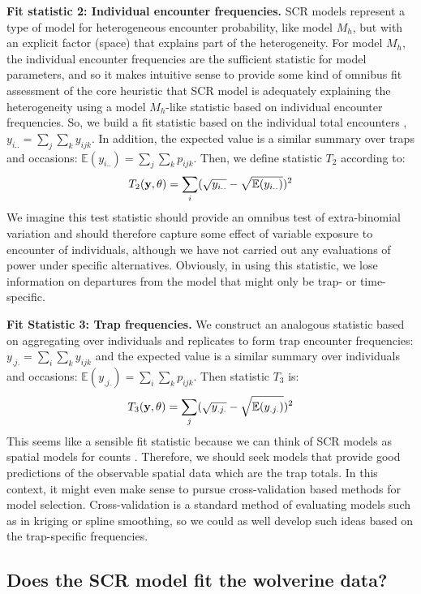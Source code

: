 {\bf Fit statistic 2: Individual encounter frequencies. } SCR models
represent a type of model for heterogeneous encounter probability, like model $M_h$, but with an explicit
factor (space) that explains part of the heterogeneity. For model $M_h$, the
individual encounter frequencies are the sufficient statistic for
model parameters, and so it makes intuitive sense to provide some kind
of omnibus fit assessment of the core heuristic that SCR model is
adequately explaining the heterogeneity using a model $M_h$-like
statistic based on individual encounter frequencies.  So, we build a
fit statistic based on the individual total encounters
\citep{russell_etal:2012}, $y_{i..} = \sum_{j} \sum_{k} y_{ijk}$. In
addition, the expected value is a similar summary over traps and
occasions: $\mathbb{E}(y_{i..}) = \sum_{j} \sum_{k}
p_{ijk}$. Then, we define statistic $T_{2}$ according to:
\[
 T_{2}({\bf y}, \theta) = \sum_{i} (\sqrt{ y_{i..} } - \sqrt{ \mathbb{E}(y_{i..}) })^2
\]
We imagine this test statistic should provide an omnibus test of
extra-binomial variation and should therefore capture some effect of
variable exposure to encounter of individuals, although we have not
carried out any evaluations of power under specific alternatives.
Obviously, in using this statistic, we lose information on departures
from the model that might only be trap- or time-specific.


{\bf Fit Statistic 3: Trap frequencies. } We construct an analogous
statistic based on aggregating over individuals and replicates to form
trap encounter frequencies: $y_{.j.} = \sum_{i} \sum_{k} y_{ijk}$
\citep{gopalaswamy_etal:2012ecol} and the expected value is a similar
summary over individuals and occasions: $\mathbb{E}(y_{.j.}) = \sum_{i}
\sum_{k} p_{ijk}$.  Then statistic $T_{3}$ is:
\[
 T_{3}({\bf y}, \theta) = \sum_{j} (\sqrt{ y_{.j.} } - \sqrt{ \mathbb{E}(y_{.j.}) })^2
\]
This seems like a sensible fit statistic because we can think of SCR
models as 
spatial models for counts
\citep{chandler_royle:2012}. Therefore, we should seek models that
provide good predictions of the observable spatial data which are the
trap totals.  In this context, it might even make sense to pursue
cross-validation based methods for model selection.  Cross-validation 
is a standard method of evaluating models such as in kriging or spline
smoothing, so we could as well develop such ideas based on the
trap-specific frequencies.

\subsection{Does the SCR model fit the wolverine data?}

